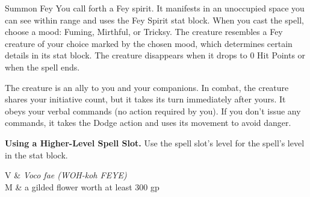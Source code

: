 \begin{Spell}[
  tags=Concentration,
  level={3rd},
  time={1 action},
  range={90 ft},
  components={V, S, M},
  duration={1 hour},
  school={Conjuration},
  attack={None},
  effect={Summoning}
]{Summon Fey}
You call forth a Fey spirit. It manifests in an unoccupied space you can see within range and uses the Fey Spirit stat block. When you cast the spell, choose a mood: Fuming, Mirthful, or Tricksy. The creature resembles a Fey creature of your choice marked by the chosen mood, which determines certain details in its stat block. The creature disappears when it drops to 0 Hit Points or when the spell ends.

The creature is an ally to you and your companions. In combat, the creature shares your initiative count, but it takes its turn immediately after yours. It obeys your verbal commands (no action required by you). If you don't issue any commands, it takes the Dodge action and uses its movement to avoid danger.

\textbf{Using a Higher-Level Spell Slot.} Use the spell slot's level for the spell's level in the stat block.

\begin{components}
V & \textit{Voco fae (WOH-koh FEYE)} \\
M & a gilded flower worth at least 300 gp
\end{components}
\end{Spell}



